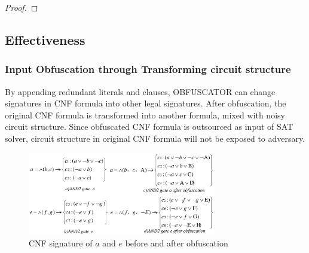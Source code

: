 \documentclass[conference]{IEEEtran}
\begin{document}
\begin{proof}
% 
% 
% 
\end{proof}

\subsection{Effectiveness}
\subsubsection{Input Obfuscation through Transforming circuit structure}

By appending redundant literals and clauses,
OBFUSCATOR can change signatures in CNF formula into other legal signatures.
After obfuscation, the original CNF formula is transformed into another formula,
mixed with noisy circuit structure.
Since obfuscated CNF formula is outsourced as input of SAT solver,
circuit structure in original CNF formula will not  be exposed to adversary.


\begin{figure}[b]
\centering
\includegraphics[width=8.2cm]{AND2-2}
\caption{CNF signature of $a$ and $e$ before and after obfuscation}
\label{fig_beforeafter}
\end{figure}
\end{document}
